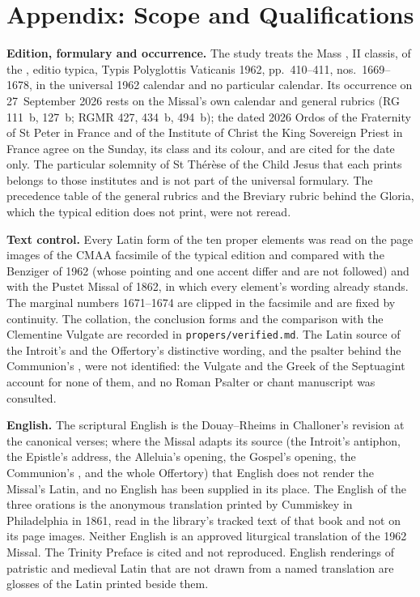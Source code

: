 \section{Appendix: Scope and Qualifications}
\label{sec:scope}

{\small
\textbf{Edition, formulary and occurrence.} The study treats the Mass
, II classis, of the
, editio typica, Typis Polyglottis Vaticanis 1962,
pp.~410--411, nos.~1669--1678, in the universal 1962 calendar and no particular
calendar. Its occurrence on 27~September 2026 rests on the Missal's own calendar
and general rubrics (RG 111~b, 127~b; RGMR 427, 434~b, 494~b); the dated 2026
Ordos of the Fraternity of St Peter in France and of the Institute of Christ the
King Sovereign Priest in France agree on the Sunday, its class and its colour,
and are cited for the date only. The particular solemnity of St Thérèse of the
Child Jesus that each prints belongs to those institutes and is not part of the
universal formulary. The precedence table of the general rubrics and the
Breviary rubric behind the Gloria, which the typical edition does not print,
were not reread.

\textbf{Text control.} Every Latin form of the ten proper elements was read on
the page images of the CMAA facsimile of the typical edition and compared with
the Benziger  of 1962 (whose pointing and one
accent differ and are not followed) and with the Pustet Missal of 1862, in
which every element's wording already stands. The marginal numbers 1671--1674
are clipped in the facsimile and are fixed by continuity. The collation, the
conclusion forms and the comparison with the Clementine Vulgate are recorded in
\texttt{propers/verified.md}. The Latin source of the Introit's and the
Offertory's distinctive wording, and the psalter behind the Communion's
, were not identified: the Vulgate and the Greek of the Septuagint account
for none of them, and no Roman Psalter or chant manuscript was consulted.

\textbf{English.} The scriptural English is the Douay--Rheims in Challoner's
revision at the canonical verses; where the Missal adapts its source (the
Introit's antiphon, the Epistle's address, the Alleluia's opening, the Gospel's
opening, the Communion's , and the whole Offertory) that English
does not render the Missal's Latin, and no English has been supplied in its
place. The English of the three orations is the anonymous translation printed
by Cummiskey in Philadelphia in 1861, read in the library's tracked text of that
book and not on its page images. Neither English is an approved liturgical
translation of the 1962 Missal. The Trinity Preface is cited and not
reproduced. English renderings of patristic and medieval Latin that are not
drawn from a named translation are glosses of the Latin printed beside them.

}
